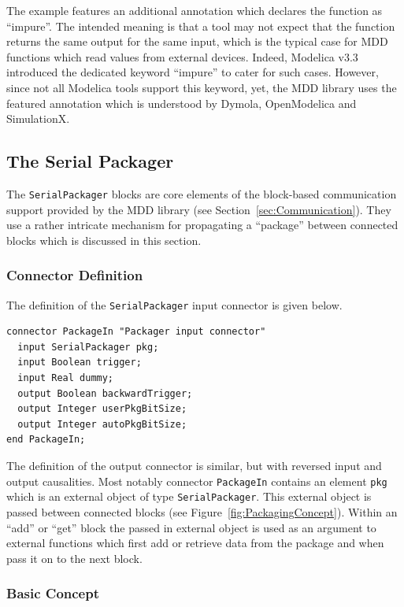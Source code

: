 \documentclass{resources/modelica}
\newcommand{\modelica}[1]{\lstinline[language=modelica]|#1|}
\begin{document}
The example features an additional annotation which declares the function
as ``impure''. The intended meaning is that a tool may not expect that the
function returns the same output for the same input, which is the typical case
for MDD functions which read values from external devices. Indeed, Modelica v3.3 introduced the dedicated keyword
``impure'' to cater for such cases. However, since not all Modelica tools support this
keyword, yet, the MDD library uses the featured annotation which is understood
by Dymola, OpenModelica and SimulationX.

\subsection{The Serial Packager}
\label{sec:SerialPackager}

The \modelica{SerialPackager} blocks are core elements of the block-based
communication support provided by the MDD library (see
Section~\ref{sec:Communication}). They use a rather intricate mechanism for
propagating a “package” between connected blocks which is discussed in this
section.

\subsubsection{Connector Definition}

The definition of the \modelica{SerialPackager} input connector is given below.
\begin{lstlisting}[language=modelica]
connector PackageIn "Packager input connector"
  input SerialPackager pkg;
  input Boolean trigger;
  input Real dummy;
  output Boolean backwardTrigger;
  output Integer userPkgBitSize;
  output Integer autoPkgBitSize;
end PackageIn;
\end{lstlisting}
The definition of the output connector is similar, but with reversed input and
output causalities. Most notably connector \modelica{PackageIn} contains an
element \modelica{pkg} which is an external object of type \modelica{SerialPackager}.
This external object is passed between connected blocks (see
Figure~\ref{fig:PackagingConcept}). Within an ``add'' or ``get'' block the
passed in external object is used as an argument to external functions which
first add or retrieve data from the package and when pass it on to the next block.

\subsubsection{Basic Concept}
\end{document}
